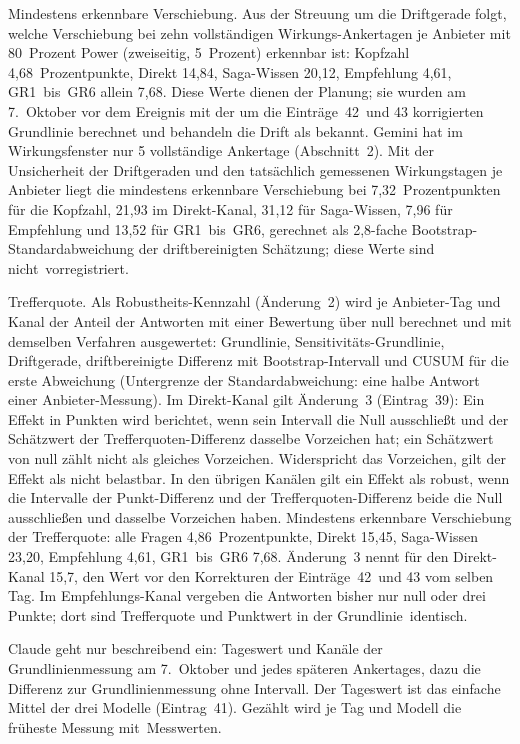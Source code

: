 \documentclass[11pt]{article}
\begin{document}
Mindestens erkennbare Verschiebung. Aus der Streuung um die Driftgerade folgt, welche Verschiebung bei zehn vollständigen Wirkungs-Ankertagen je Anbieter mit 80~Prozent Power (zweiseitig, 5~Prozent) erkennbar ist: Kopfzahl 4,68~Prozentpunkte, Direkt 14,84, Saga-Wissen 20,12, Empfehlung 4,61, GR1~bis~GR6 allein 7,68. Diese Werte dienen der Planung; sie wurden am 7.~Oktober vor dem Ereignis mit der um die Einträge~42~und 43 korrigierten Grundlinie berechnet und behandeln die Drift als bekannt. Gemini hat im Wirkungsfenster nur 5 vollständige Ankertage (Abschnitt~2). Mit der Unsicherheit der Driftgeraden und den tatsächlich gemessenen Wirkungstagen je Anbieter liegt die mindestens erkennbare Verschiebung bei 7,32~Prozentpunkten für die Kopfzahl, 21,93 im Direkt-Kanal, 31,12 für Saga-Wissen, 7,96 für Empfehlung und 13,52 für GR1~bis~GR6, gerechnet als 2,8-fache Bootstrap-Standardabweichung der driftbereinigten Schätzung; diese Werte sind nicht~\mbox{vorregistriert.}

Trefferquote. Als Robustheits-Kennzahl (Änderung~2) wird je Anbieter-Tag und Kanal der Anteil der Antworten mit einer Bewertung über null berechnet und mit demselben Verfahren ausgewertet: Grundlinie, Sensitivitäts-Grundlinie, Driftgerade, driftbereinigte Differenz mit Bootstrap-Intervall und CUSUM für die erste Abweichung (Untergrenze der Standardabweichung: eine halbe Antwort einer Anbieter-Messung). Im Direkt-Kanal gilt Änderung~3 (Eintrag~39): Ein Effekt in Punkten wird berichtet, wenn sein Intervall die Null ausschließt und der Schätzwert der Trefferquoten-Differenz dasselbe Vorzeichen hat; ein Schätzwert von null zählt nicht als gleiches Vorzeichen. Widerspricht das Vorzeichen, gilt der Effekt als nicht belastbar. In den übrigen Kanälen gilt ein Effekt als robust, wenn die Intervalle der Punkt-Differenz und der Trefferquoten-Differenz beide die Null ausschließen und dasselbe Vorzeichen haben. Mindestens erkennbare Verschiebung der Trefferquote: alle Fragen 4,86~Prozentpunkte, Direkt 15,45, Saga-Wissen 23,20, Empfehlung 4,61, GR1~bis~GR6 7,68. Änderung~3 nennt für den Direkt-Kanal 15,7, den Wert vor den Korrekturen der Einträge~42~und 43 vom selben Tag. Im Empfehlungs-Kanal vergeben die Antworten bisher nur null oder drei Punkte; dort sind Trefferquote und Punktwert in der Grundlinie~\mbox{identisch.}

Claude geht nur beschreibend ein: Tageswert und Kanäle der Grundlinienmessung am 7.~Oktober und jedes späteren Ankertages, dazu die Differenz zur Grundlinienmessung ohne Intervall. Der Tageswert ist das einfache Mittel der drei Modelle (Eintrag~41). Gezählt wird je Tag und Modell die früheste Messung mit~\mbox{Messwerten.}
\end{document}
